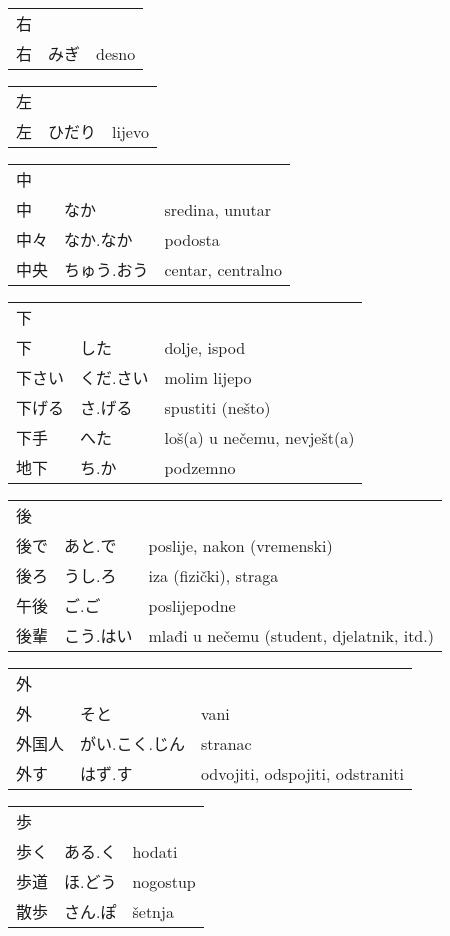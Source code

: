 

\newenvironment{dictentry}[1]{
	\begin{tabular}{p{2cm} p{3cm} p{10cm}}
		#1 &&\\
}{
	\end{tabular}
	\vspace{20pt}
}

\newcommand{\example}[3]{
	\hspace*{\fill}#1 & #2 & #3\\
}

\author{ロボット君}


\begin{dictentry}{右}
\example{右}{みぎ}{desno}
\end{dictentry}

\begin{dictentry}{左}
\example{左}{ひだり}{lijevo}
\end{dictentry}

\begin{dictentry}{中}
\example{中}{なか}{sredina, unutar}
\example{中々}{なか.なか}{podosta}
\example{中央}{ちゅう.おう}{centar, centralno}
\end{dictentry}

\begin{dictentry}{下}
\example{下}{した}{dolje, ispod}
\example{下さい}{くだ.さい}{molim lijepo}
\example{下げる}{さ.げる}{spustiti (nešto)}
\example{下手}{へた\footnotemark[1]}{loš(a) u nečemu, nevješt(a)}
\example{地下}{ち.か}{podzemno}
\end{dictentry}

\begin{dictentry}{後}
\example{後で}{あと.で}{poslije, nakon (vremenski)}
\example{後ろ}{うし.ろ}{iza (fizički), straga}
\example{午後}{ご.ご}{poslijepodne}
\example{後輩}{こう.はい}{mlađi u nečemu (student, djelatnik, itd.)}
\end{dictentry}

\begin{dictentry}{外}
\example{外}{そと}{vani}
\example{外国人}{がい.こく.じん}{stranac}
\example{外す}{はず.す}{odvojiti, odspojiti, odstraniti}
\end{dictentry}

\begin{dictentry}{歩}
\example{歩く}{ある.く}{hodati}
\example{歩道}{ほ.どう}{nogostup}
\example{散歩}{さん.ぽ}{šetnja}
\end{dictentry}

